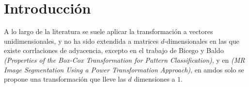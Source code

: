 \chapter{Introducci\'on}\label{chap1}

A lo largo de la literatura se suele aplicar la transformaci\'on a vectores unidimensionales, y no ha sido extendida a matrices $d$-dimensionales en las que existe corrlaciones de adyacencia, excepto en el trabajo de Bicego y Baldo \textit{(Properties of the Box-Cox Transformation for Pattern Classification)}, y en \textit{(MR Image Segmentation Using a Power Transformation Approach)}, en amdos 
solo se propone una transformaci\'on que lleve las $d$ dimensiones a $1$.
